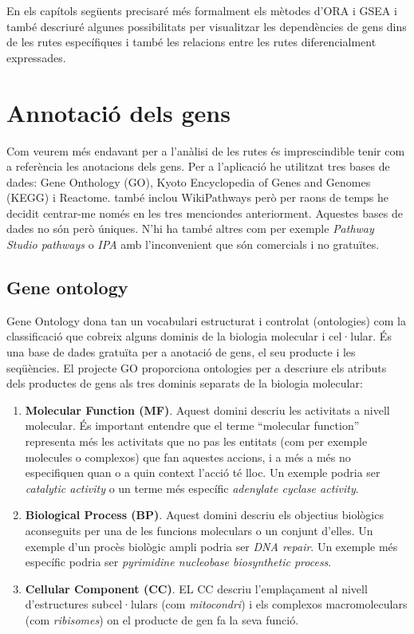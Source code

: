 \begin{itemize}
En els capítols següents precisaré més formalment els mètodes d'\gls{ORA} i \gls{GSEA} i també descriuré algunes possibilitats per visualitzar les dependències de gens dins de les rutes específiques i també les relacions entre les rutes diferencialment expressades.

\end{itemize}


\section{Annotació dels gens}

Com veurem més endavant per a l’anàlisi de les rutes és imprescindible tenir com a referència les anotacions dels gens. Per a l’aplicació he utilitzat tres bases de dades: Gene Onthology (GO), Kyoto Encyclopedia of Genes and Genomes (KEGG) i Reactome.  també inclou WikiPathways però per raons de temps he decidit centrar-me només en les tres menciondes anteriorment. Aquestes bases de dades no són però úniques. N'hi ha també altres com per exemple \textit{Pathway Studio pathways} o \textit{IPA} amb l’inconvenient que són comercials i no gratuïtes. 

\subsection{Gene ontology}
Gene Ontology \cite{gene2004gene} dona tan un vocabulari estructurat i controlat (ontologies) com la classificació que cobreix alguns dominis de la biologia molecular i cel·lular. És una base de dades gratuïta per a anotació de gens, el seu producte i les seqüències. El projecte \gls{GO} proporciona ontologies per a descriure els atributs dels productes de gens als tres dominis separats de la biologia molecular:
\begin{enumerate}
\item \textbf{Molecular Function (MF)}. Aquest domini descriu les activitats a nivell molecular. És important entendre que el terme ``molecular function'' representa més les activitats que no pas les entitats (com per exemple molecules o complexos) que fan aquestes accions, i a més a més no especifiquen quan o a quin context l'acció té lloc. Un exemple podria ser \textit{catalytic activity} o un terme més específic \textit{adenylate cyclase activity}.
\item \textbf{Biological Process (BP)}. Aquest domini descriu els objectius biològics aconseguits per una de les funcions moleculars o un conjunt d’elles. Un exemple d'un procès biològic ampli podria ser \textit{DNA repair}. Un exemple més específic podria ser \textit{pyrimidine nucleobase biosynthetic process}. 
\item \textbf{Cellular Component (CC)}. EL CC descriu l'emplaçament al nivell d'estructures subcel·lulars (com \textit{mitocondri}) i els complexos macromoleculars (com \textit{ribisomes}) on el producte de gen fa la seva funció.
\end{enumerate}

